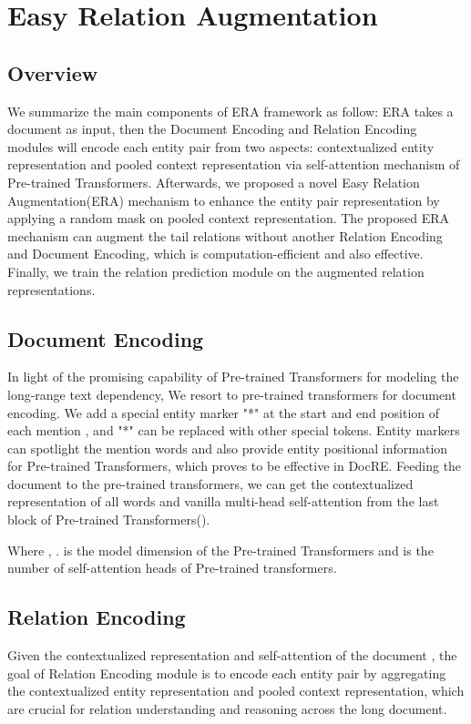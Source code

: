 \documentclass[11pt]{article}
\begin{document}
\section{Easy Relation Augmentation}
\subsection{Overview}
We summarize the main components of ERA framework as follow: ERA takes a document  as input, then the Document Encoding and Relation Encoding modules will encode each entity pair  from two aspects: contextualized entity representation and pooled context representation via self-attention mechanism of Pre-trained Transformers\citep{zhou_atlop_2021}. Afterwards, we proposed a novel Easy Relation Augmentation(ERA) mechanism to enhance the entity pair representation by applying a random mask on pooled context representation. The proposed ERA mechanism can augment the tail relations  without another Relation Encoding and Document Encoding, which is computation-efficient and also effective. Finally, we train the relation prediction module on the augmented relation representations.
\subsection{Document Encoding}
    In light of the promising capability of Pre-trained Transformers\citep{devlin-etal-2019-bert,liu_roberta_2019} for modeling the long-range text dependency, We resort to pre-trained transformers for document encoding. We add a special entity marker "*"\citep{zhang-etal-2017-position} at the start and end position of each mention , and "*" can be replaced with other special tokens. Entity markers can spotlight the mention words and also provide entity positional information for Pre-trained Transformers, which proves to be effective in DocRE\citep{zhou_atlop_2021}. Feeding the document  to the pre-trained transformers, we can get the contextualized representation  of all words and vanilla multi-head self-attention  from the last block of Pre-trained Transformers().
    
    Where , .  is the model dimension of the Pre-trained Transformers and  is the number of self-attention heads of Pre-trained transformers.
\subsection{Relation Encoding}
    Given the contextualized representation  and self-attention  of the document , the goal of Relation Encoding module is to encode each entity pair  by aggregating the contextualized entity representation and pooled context representation, which are crucial for relation understanding and reasoning across the long document.
    
\end{document}
